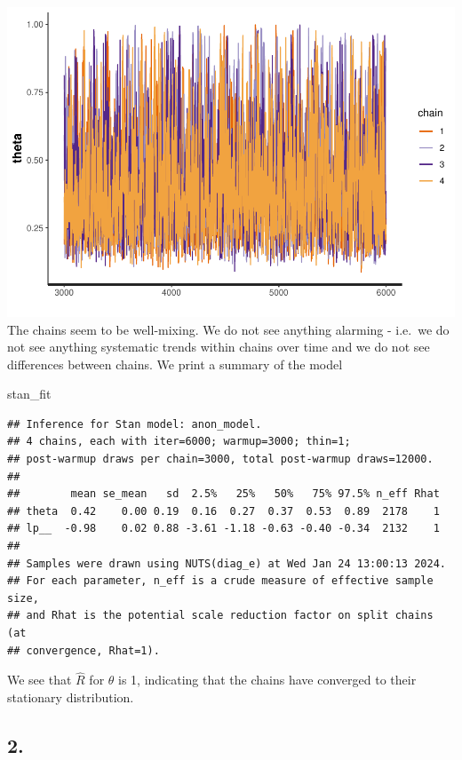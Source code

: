 \documentclass[
]{article}
\newenvironment{Shaded}{\begin{snugshade}}{\end{snugshade}}
\newcommand{\NormalTok}[1]{#1}
\begin{document}
\includegraphics{besvarels_files/figure-latex/unnamed-chunk-16-1.pdf}
The chains seem to be well-mixing. We do not see anything alarming -
i.e.~we do not see anything systematic trends within chains over time
and we do not see differences between chains. We print a summary of the
model

\begin{Shaded}
\begin{Highlighting}[]
\NormalTok{stan\_fit}
\end{Highlighting}
\end{Shaded}

\begin{verbatim}
## Inference for Stan model: anon_model.
## 4 chains, each with iter=6000; warmup=3000; thin=1; 
## post-warmup draws per chain=3000, total post-warmup draws=12000.
## 
##        mean se_mean   sd  2.5%   25%   50%   75% 97.5% n_eff Rhat
## theta  0.42    0.00 0.19  0.16  0.27  0.37  0.53  0.89  2178    1
## lp__  -0.98    0.02 0.88 -3.61 -1.18 -0.63 -0.40 -0.34  2132    1
## 
## Samples were drawn using NUTS(diag_e) at Wed Jan 24 13:00:13 2024.
## For each parameter, n_eff is a crude measure of effective sample size,
## and Rhat is the potential scale reduction factor on split chains (at 
## convergence, Rhat=1).
\end{verbatim}

We see that \(\hat{R}\) for \(\theta\) is 1, indicating that the chains
have converged to their stationary distribution.

\hypertarget{section-11}{%
\subsection{2.}\label{section-11}}
\end{document}

